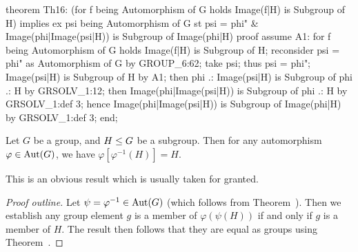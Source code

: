 \nwenddocs{}\endmoddef\nwstartdeflinemarkup{}\nwenddeflinemarkup
theorem Th16:
  (for f being Automorphism of G holds Image(f|H) is Subgroup of H) implies
  ex psi being Automorphism of G
  st psi = phi" & Image(phi|Image(psi|H)) is Subgroup of Image(phi|H)
proof
  assume A1: for f being Automorphism of G holds Image(f|H) is Subgroup of H;
  reconsider psi = phi" as Automorphism of G by GROUP_6:62;
  take psi;
  thus psi = phi";
  Image(psi|H) is Subgroup of H by A1;
  then phi .: Image(psi|H) is Subgroup of phi .: H by GRSOLV_1:12;
  then Image(phi|Image(psi|H)) is Subgroup of phi .: H by GRSOLV_1:def 3;
  hence Image(phi|Image(psi|H)) is Subgroup of Image(phi|H) by GRSOLV_1:def 3;
end;
\eatline
{}\nwendcode{}\nwdocspar
\begin{theorem}\label{thm:characteristic:automorphism:phi-phiInv-H-is-H}
  Let $G$ be a group, and $H\leq G$ be a subgroup.
  Then for any automorphism $\varphi\in\operatorname{Aut}(G)$, we have
  $\varphi[\varphi^{-1}(H)]=H$.
\end{theorem}

This is an obvious result which is usually taken for granted.

\begin{proof}[Proof outline]
Let $\psi=\varphi^{-1}\in\operatorname{Aut}(G)$ (which follows from
Theorem~). Then we establish any
group element $g$ is a member of $\varphi(\psi(H))$ if and only if $g$
is a member of $H$.
The result then follows that they are equal as groups using Theorem~.
\end{proof}

